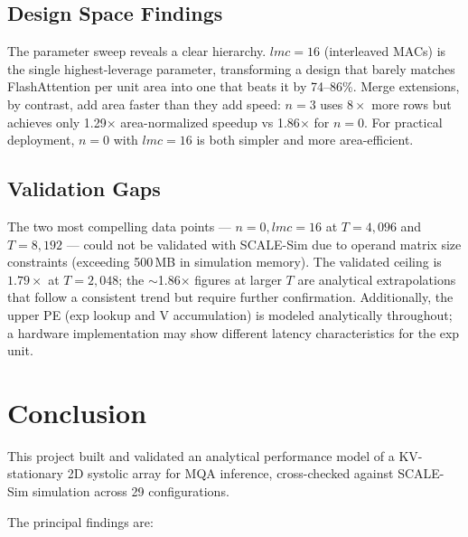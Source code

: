 \documentclass[11pt]{article}
\begin{document}
\subsection{Design Space Findings}

The parameter sweep reveals a clear hierarchy.
\(lmc = 16\) (interleaved MACs) is the single highest-leverage
parameter, transforming a design that barely matches FlashAttention
per unit area into one that beats it by 74--86\%.
Merge extensions, by contrast, add area faster than they add speed:
\(n = 3\) uses \(8\times\) more rows but achieves only
1.29$\times$ area-normalized speedup vs 1.86$\times$ for \(n = 0\).
For practical deployment, \(n = 0\) with \(lmc = 16\) is both
simpler and more area-efficient.

\subsection{Validation Gaps}

The two most compelling data points --- \(n = 0, lmc = 16\) at
\(T = 4{,}096\) and \(T = 8{,}192\) --- could not be validated
with SCALE-Sim due to operand matrix size constraints
(exceeding 500\,MB in simulation memory).
The validated ceiling is \(1.79\times\) at \(T = 2{,}048\);
the \(\sim\)1.86$\times$ figures at larger \(T\) are analytical
extrapolations that follow a consistent trend but require
further confirmation.
Additionally, the upper PE (exp lookup and V accumulation)
is modeled analytically throughout; a hardware implementation
may show different latency characteristics for the exp unit.

\section{Conclusion}

This project built and validated an analytical performance model
of a KV-stationary 2D systolic array for MQA inference,
cross-checked against SCALE-Sim simulation across 29 configurations.

The principal findings are:
\end{document}
